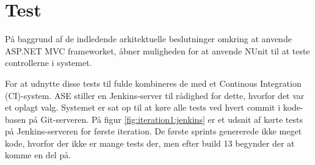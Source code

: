 \section{Test}

På baggrund af de indledende arkitektuelle beslutninger omkring at anvende ASP.NET MVC frameworket, åbner muligheden for at anvende NUnit \citep{nunitWeb} til at teste controllerne i systemet.

For at udnytte disse tests til fulde kombineres de med et Continous Integration (CI)-system. ASE stiller en Jenkins-server \citep{jenkinsWeb} til rådighed for dette, hvorfor det var et oplagt valg. 
Systemet er sat op til at køre alle tests ved hvert commit i kode-basen på Git-serveren. På figur \ref{fig:iteration1:jenkins} er et udsnit af kørte tests på Jenkins-serveren for første iteration. De første sprints genererede ikke meget kode, hvorfor der ikke er mange tests der, men efter build 13 begynder der at komme en del på.



